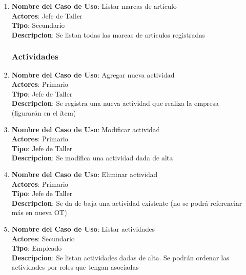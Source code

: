 \documentclass[12pt]{extarticle}
\begin{document}
\begin{spacing}{1.2}
\begin{enumerate}
        \item 	\textbf{Nombre del Caso de Uso}: Listar marcas de artículo\\
                \textbf{Actores}: Jefe de Taller\\
                \textbf{Tipo}: Secundario\\
                \textbf{Descripcion}: Se listan todas las marcas de artículos registradas	



        \subsubsection{Actividades}



        \item 	\textbf{Nombre del Caso de Uso}: Agregar nueva actividad\\
                \textbf{Actores}: Primario\\
                \textbf{Tipo}: Jefe de Taller\\
                \textbf{Descripcion}: Se registra una nueva actividad que realiza la empresa (figurarán en el ítem)

        \item 	\textbf{Nombre del Caso de Uso}: Modificar actividad\\
                \textbf{Actores}: Primario\\
                \textbf{Tipo}: Jefe de Taller\\
                \textbf{Descripcion}: Se modifica una actividad dada de alta

        \item 	\textbf{Nombre del Caso de Uso}: Eliminar actividad\\
                \textbf{Actores}: Primario\\
                \textbf{Tipo}: Jefe de Taller\\
                \textbf{Descripcion}: Se da de baja una actividad existente (no se podrá referenciar más en nueva OT)

        \item 	\textbf{Nombre del Caso de Uso}: Listar actividades\\
                \textbf{Actores}: Secundario\\
                \textbf{Tipo}: Empleado\\
                \textbf{Descripcion}: Se listan actividades dadas de alta. Se podrán ordenar las actividades por roles que tengan asociadas




\end{enumerate}
\end{spacing}
\end{document}
